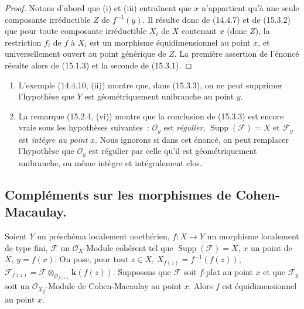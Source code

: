 \begin{proof}
Notons d'abord que (i) et (iii) entraînent que $x$ n'appartient qu'à une seule
composante irréductible $Z$ de $f^{-1}(y)$. Il résulte donc de (14.4.7) et de
(15.3.2) que pour toute composante irréductible $X_i$ de $X$ contenant $x$
(donc $Z$), la restriction $f_i$ de $f$ à $X_i$ est un morphisme
équidimensionnel au point $x$, et universellement ouvert au point générique de
$Z$. La première assertion de l'énoncé résulte alors de (15.1.3) et la seconde
de (15.3.1).
\end{proof}

\begin{remarks}[15.3.4]
\label{IV.15.3.4-fr}
\begin{enumerate}[label=(\roman*)]
  \item L'exemple (14.4.10, (ii)) montre que, dans (15.3.3), on ne peut
  supprimer l'hypothèse que $Y$ est géométriquement unibranche au point $y$.
  \item La remarque (15.2.4, (vi)) montre que la conclusion de (15.3.3) est
  encore vraie sous les hypothèses suivantes~: $\mathcal O_y$ est \emph{régulier},
  $\operatorname{Supp}(\mathcal F)=X$ et $\mathcal F_y$ est \emph{intègre au point}
  $x$. Nous ignorons si dans cet énoncé, on peut remplacer l'hypothèse que
  $\mathcal O_y$ est régulier par celle qu'il est géométriquement unibranche, ou
  même intègre et intégralement clos.
\end{enumerate}
\end{remarks}

\subsection{Compléments sur les morphismes de Cohen-Macaulay.}
\label{subsection:IV.15.4-fr}

\begin{proposition}[15.4.1]
\label{IV.15.4.1-fr}
Soient $Y$ un préschéma localement noethérien, $f:X\to Y$ un morphisme localement
de type fini, $\mathcal F$ un $\mathcal O_X$-Module cohérent tel que
$\operatorname{Supp}(\mathcal F)=X$, $x$ un point de $X$, $y=f(x)$. On pose,
pour tout $z\in X$, $X_{f(z)}=f^{-1}(f(z))$,
$\mathcal F_{f(z)}=\mathcal F\otimes_{\mathcal O_{f(z)}}\boldsymbol{k}(f(z))$.
Supposons que $\mathcal F$ soit $f$-plat au point $x$ et que $\mathcal F_y$ soit
un $\mathcal O_{X_y}$-Module de Cohen-Macaulay au point $x$. Alors $f$ est
équidimensionnel au point $x$.
\end{proposition}

